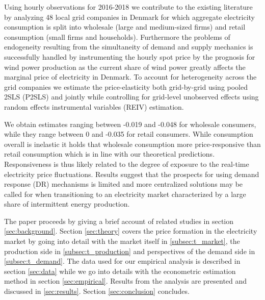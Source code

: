 Using hourly observations for 2016-2018 we contribute to the existing literature by analyzing 48 local grid companies in Denmark for which aggregate electricity consumption is split into wholesale (large and medium-sized firms) and retail consumption (small firms and households). Furthermore the problems of endogeneity resulting from the simultaneity of demand and supply mechanics is successfully handled by instrumenting the hourly spot price by the prognosis for wind power production as the current share of wind power greatly affects the marginal price of electricity in Denmark. To account for heterogeneity across the grid companies we estimate the price-elasticity both grid-by-grid using pooled 2SLS (P2SLS) and jointly while controlling for grid-level unobserved effects using random effects instrumental variables (REIV) estimation.
\par 
We obtain estimates ranging between -0.019 and -0.048 for wholesale consumers, while they range between 0 and -0.035 for retail consumers.  While consumption overall is inelastic it holds that wholesale consumption more price-responsive than retail consumption which is in line with our theoretical predictions. Responsiveness is thus likely related to the degree of exposure to the real-time electricity price fluctuations. Results suggest that the prospects for using demand response (DR) mechanisms is limited and more centralized solutions may be called for when transitioning to an electricity market characterized by a large share of intermittent energy production. 
\medskip

The paper proceeds by giving a brief account of related studies in section \ref{sec:background}. Section \ref{sec:theory} covers the price formation in the electricity market by going into detail with the market itself in \ref{subsec:t_market}, the production side in \ref{subsec:t_production} and perspectives of the demand side in \ref{subsec:t_demand}. The data used for our empirical analysis is described in section \ref{sec:data} while we go into details with the econometric estimation method in section \ref{sec:empirical}. Results from the analysis are presented and discussed in \ref{sec:results}. Section \ref{sec:conclusion} concludes.
